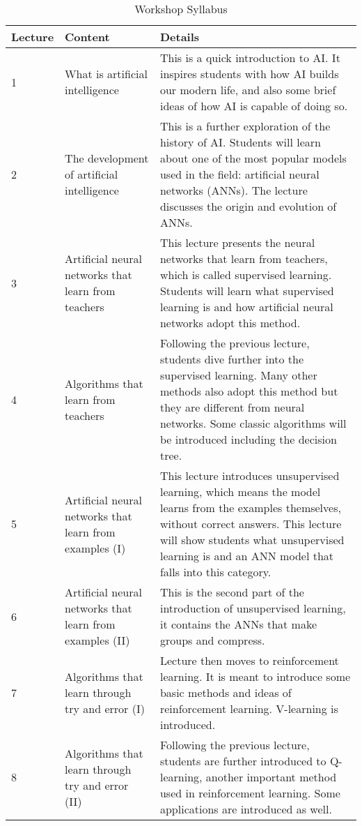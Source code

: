 \begin{table*}[]
\caption{Workshop Syllabus}
\label{tab:workshop syllabus}
\begin{tabular}{p{1cm} p{4cm} p{10cm}}
\hline
Lecture  & Content  & Details \\ \hline
1 & What is artificial intelligence & This is a quick introduction to AI. It inspires students with how AI builds our modern life, and also some brief ideas of how AI is capable of doing so.     \\ \hline
2 &The development of artificial intelligence&This is a further exploration of the history of AI. Students will learn about one of the most popular models used in the field: artificial neural networks (ANNs). The lecture discusses the origin and evolution of ANNs.\\ \hline
3 &Artificial neural networks that learn from teachers&This lecture presents the neural networks that learn from teachers, which is called supervised learning. Students will learn what supervised learning is and how artificial neural networks adopt this method.\\ \hline
4 &Algorithms that learn from teachers&Following the previous lecture, students dive further into the supervised learning. Many other methods also adopt this method but they are different from neural networks. Some classic algorithms will be introduced including the decision tree.\\ \hline
5 &Artificial neural networks that learn from examples (I)&This lecture introduces unsupervised learning, which means the model learns from the examples themselves, without correct answers. This lecture will show students what unsupervised learning is and an ANN model that falls into this category.\\ \hline
6 &Artificial neural networks that learn from examples (II)&This is the second part of the introduction of unsupervised learning, it contains the ANNs that make groups and compress. \\ \hline
7 &Algorithms that learn through try and error (I) &Lecture then moves to reinforcement learning. It is meant to introduce some basic methods and ideas of reinforcement learning. V-learning is introduced.\\ \hline
8 &Algorithms that learn through try and error (II) &Following the previous lecture, students are further introduced to Q-learning, another important method used in reinforcement learning. Some applications are introduced as well.\\ \hline

\end{tabular}
\end{table*}
